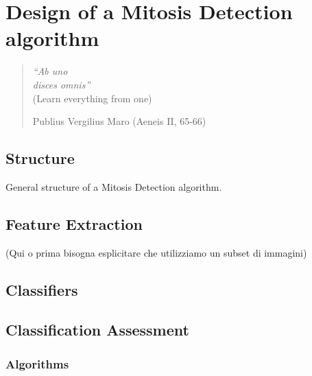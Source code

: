 \chapter{Design of a Mitosis Detection algorithm}
\label{chapter4}
\thispagestyle{empty}

\begin{quotation}
{\footnotesize
\noindent \emph{``Ab uno\\ disces omnis''}\\
\noindent (Learn everything from one)
\begin{flushright}
Publius Vergilius Maro (Aeneis II, 65-66)
\end{flushright}
}
\end{quotation}

\vspace{0.5cm}


\section{Structure}

General structure of a Mitosis Detection algorithm.

\vspace{0.5cm}

\section{Feature Extraction}

(Qui o prima bisogna esplicitare che utilizziamo un subset di immagini)

\section{Classifiers}









\section{Classification Assessment}

\subsection{Algorithms}






